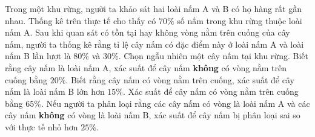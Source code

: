 \begin{ex}
Trong một khu rừng, người ta khảo sát hai loài nấm A và B có họ hàng rất gần nhau. Thống kê trên thực tế cho thấy có $70\%$ số nấm trong khu rừng thuộc loài nấm A. Sau khi quan sát có tồn tại hay không vòng nằm trên cuống của cây nấm, người ta thống kê rằng tỉ lệ cây nấm có đặc điểm này ở loài nấm A và loài nấm B lần lượt là $80\%$ và $30\%$. Chọn ngẫu nhiên một cây nấm tại khu rừng.
\choiceTF
{\True Biết rằng cây nấm là loài nấm A, xác suất để cây nấm \textbf{không} có vòng nằm trên cuống bằng $20\%$.}
{Biết rằng cây nấm có vòng nằm trên cuống, xác suất để cây nấm là loài nấm B lớn hơn $15\%$.}
{\True Xác suất để cây nấm có vòng nằm trên cuống bằng $65\%$.}
{\True Nếu người ta phân loại rằng các cây nấm có vòng là loài nấm A và các cây nấm \textbf{không} có vòng là loài nấm B, xác suất để cây nấm bị phân loại sai so với thực tế nhỏ hơn $25\%$.}
\end{ex}

